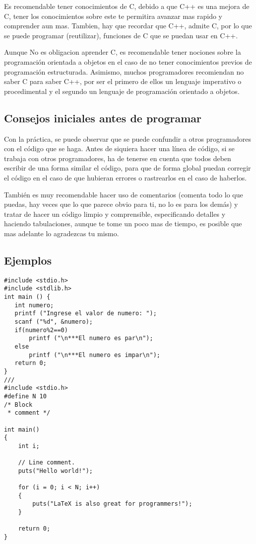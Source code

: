 Es recomendable tener conocimientos de C, debido a que C++ es una mejora de C, tener los conocimientos sobre este te permitira avanzar mas rapido y comprender aun mas. Tambien, hay que recordar que C++, admite C, por lo que se puede programar (reutilizar), funciones de C que se puedan usar en C++.

Aunque No es obligacion aprender C, es recomendable tener nociones sobre la programación orientada a objetos en el caso de no tener conocimientos previos de programación estructurada. Asimismo, muchos programadores recomiendan no saber C para saber C++, por ser el primero de ellos un lenguaje imperativo o procedimental y el segundo un lenguaje de programación orientado a objetos.

\subsection{Consejos iniciales antes de programar}

Con la práctica, se puede observar que se puede confundir a otros programadores con el código que se haga. Antes de siquiera hacer una línea de código, si se trabaja con otros programadores, ha de tenerse en cuenta que todos deben escribir de una forma similar el código, para que de forma global puedan corregir el código en el caso de que hubieran errores o rastrearlos en el caso de haberlos.

También es muy recomendable hacer uso de comentarios (comenta todo lo que puedas, hay veces que lo que parece obvio para ti, no lo es para los demás) y tratar de hacer un código limpio y comprensible, especificando detalles y haciendo tabulaciones, aunque te tome un poco mas de tiempo, es posible que mas adelante lo agradezcas tu mismo.

\subsection{Ejemplos}

\begin{lstlisting}[style=C,label=some-code,caption=Some Code]
#include <stdio.h>
#include <stdlib.h>
int main () {
   int numero;
   printf ("Ingrese el valor de numero: ");
   scanf ("%d", &numero);
   if(numero%2==0)
       printf ("\n***El numero es par\n");
   else
       printf ("\n***El numero es impar\n");
   return 0;
}
///
#include <stdio.h>
#define N 10
/* Block
 * comment */
 
int main()
{
    int i;
 
    // Line comment.
    puts("Hello world!");
 
    for (i = 0; i < N; i++)
    {
        puts("LaTeX is also great for programmers!");
    }
 
    return 0;
}
\end{lstlisting}


